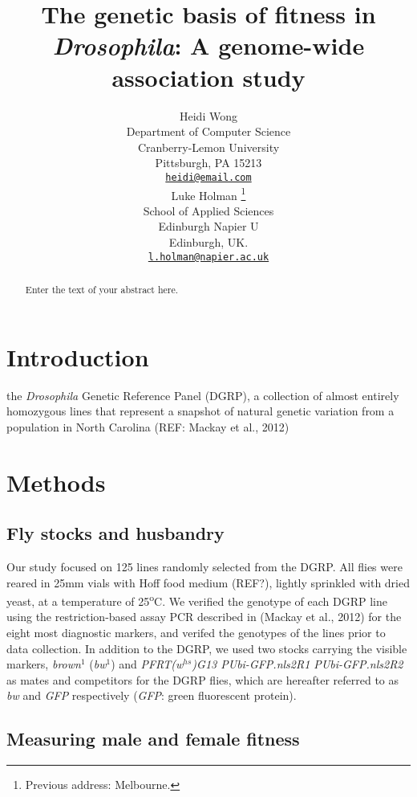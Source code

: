 \documentclass{article}
\title{The genetic basis of fitness in \textit{Drosophila}: A genome-wide
association study}
\author{
    Heidi Wong
   \\
    Department of Computer Science \\
    Cranberry-Lemon University \\
  Pittsburgh, PA 15213 \\
  \texttt{\href{mailto:heidi@email.com}{\nolinkurl{heidi@email.com}}} \\
   \And
    Luke Holman
    \thanks{Previous address: Melbourne.}
   \\
    School of Applied Sciences \\
    Edinburgh Napier U \\
  Edinburgh, UK. \\
  \texttt{\href{mailto:l.holman@napier.ac.uk}{\nolinkurl{l.holman@napier.ac.uk}}} \\
  }
\begin{document}
\maketitle

\def\tightlist{}


\begin{abstract}
Enter the text of your abstract here.
\end{abstract}


\section*{Introduction}
\lipsum[2]

the \textit{Drosophila} Genetic Reference Panel (DGRP), a collection of
almost entirely homozygous lines that represent a snapshot of natural
genetic variation from a population in North Carolina (REF: Mackay et
al., 2012)

\section*{Methods}

\subsection*{Fly stocks and husbandry}

Our study focused on 125 lines randomly selected from the DGRP. All
flies were reared in 25mm vials with Hoff food medium (REF?), lightly
sprinkled with dried yeast, at a temperature of 25\textsuperscript{o}C.
We verified the genotype of each DGRP line using the restriction-based
assay PCR described in (Mackay et al., 2012) for the eight most
diagnostic markers, and verifed the genotypes of the lines prior to data
collection. In addition to the DGRP, we used two stocks carrying the
visible markers, \textit{brown$^1$} (\textit{bw$^1$}) and
\textit{P{FRT(w$^{hs}$)}G13 P{Ubi-GFP.nls}2R1 P{Ubi-GFP.nls}2R2} as
mates and competitors for the DGRP flies, which are hereafter referred
to as \emph{bw} and \emph{GFP} respectively (\emph{GFP}: green
fluorescent protein).

\subsection*{Measuring male and female fitness}
\end{document}

